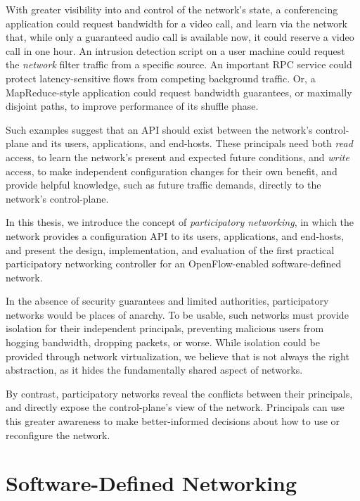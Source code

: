 With greater visibility into and control of the network's state,
a conferencing application could request bandwidth for a video call,
and learn via the network that, while only a guaranteed audio call is available
now, it could reserve a video call in one hour.
An intrusion detection script on a user machine could request the
\emph{network} filter traffic from a specific source.
An important RPC service could protect latency-sensitive flows from competing
background traffic.
Or, a MapReduce-style application could request
bandwidth guarantees, or maximally disjoint paths, to improve performance of its shuffle phase.

Such examples suggest that an API should exist between the network's
control-plane and its users, applications, and end-hosts. These
principals need both \emph{read} access, to learn the network's
present and expected future conditions, and \emph{write} access, to
make independent configuration changes for their own benefit, and
provide helpful knowledge, such as future traffic demands, directly
to the network's control-plane.

In this thesis, we introduce the concept of \emph{participatory
networking}, in which the network provides
a configuration API to its users, applications, and end-hosts, and
present the design, implementation, and evaluation of the first
practical participatory networking controller for an
OpenFlow-enabled software-defined network.

In the absence of security guarantees and limited authorities,
participatory networks would be places of anarchy. To be usable,
such networks must provide isolation for their independent
principals, preventing malicious users from hogging bandwidth,
dropping packets, or worse. While isolation could be provided
through network virtualization, we believe that is not always the
right abstraction, as it hides the fundamentally shared aspect of
networks.  

By contrast, participatory networks reveal the conflicts between
their principals, and directly expose the control-plane's view of
the network. Principals can use this greater awareness to make
better-informed decisions about how to use or reconfigure the
network.


\section{Software-Defined Networking}

